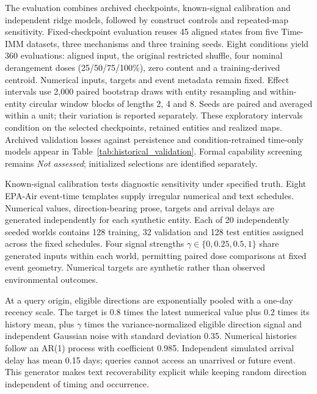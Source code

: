 The evaluation combines archived checkpoints, known-signal calibration and independent ridge models, followed by construct controls and repeated-map sensitivity. Fixed-checkpoint evaluation reuses 45 aligned states from five Time-IMM datasets, three mechanisms and three training seeds. Eight conditions yield 360 evaluations: aligned input, the original restricted shuffle, four nominal derangement doses (25/50/75/100\%), zero content and a training-derived centroid. Numerical inputs, targets and event metadata remain fixed. Effect intervals use 2,000 paired bootstrap draws with entity resampling and within-entity circular window blocks of lengths 2, 4 and 8. Seeds are paired and averaged within a unit; their variation is reported separately. These exploratory intervals condition on the selected checkpoints, retained entities and realized maps. Archived validation losses against persistence and condition-retrained time-only models appear in Table~\ref{tab:historical_validation}. Formal capability screening remains \emph{Not assessed}; initialized selections are identified separately.

Known-signal calibration tests diagnostic sensitivity under specified truth. Eight EPA-Air event-time templates supply irregular numerical and text schedules. Numerical values, direction-bearing prose, targets and arrival delays are generated independently for each synthetic entity. Each of 20 independently seeded worlds contains 128 training, 32 validation and 128 test entities assigned across the fixed schedules. Four signal strengths $\gamma\in\{0,0.25,0.5,1\}$ share generated inputs within each world, permitting paired dose comparisons at fixed event geometry. Numerical targets are synthetic rather than observed environmental outcomes.

At a query origin, eligible directions are exponentially pooled with a one-day recency scale. The target is $0.8$ times the latest numerical value plus $0.2$ times its history mean, plus $\gamma$ times the variance-normalized eligible direction signal and independent Gaussian noise with standard deviation 0.35. Numerical histories follow an AR(1) process with coefficient 0.985. Independent simulated arrival delay has mean 0.15 days; queries cannot access an unarrived or future event. This generator makes text recoverability explicit while keeping random direction independent of timing and occurrence.

